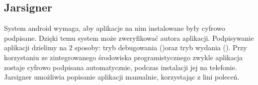 \subsection{Jarsigner}

System android wymaga, aby aplikacje na nim instalowane były cyfrowo podpisane. Dzięki temu system może zweryfikować autora aplikacji. Podpisywanie aplikacji dzielimy na 2 sposoby: tryb debugowania ()oraz tryb wydania (). Przy korzystaniu ze zintegrowanego środowiska programistycznego zwykle aplikacja zostaje cyfrowo podpisana automatycznie, podczas instalacji jej na telefonie. Jarsigner umożliwia popisanie aplikacji manualnie, korzystając z lini poleceń.
